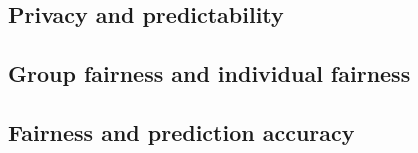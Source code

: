 
\subsection{Privacy and predictability}

\subsection{Group fairness and individual fairness}

\subsection{Fairness and prediction accuracy}
